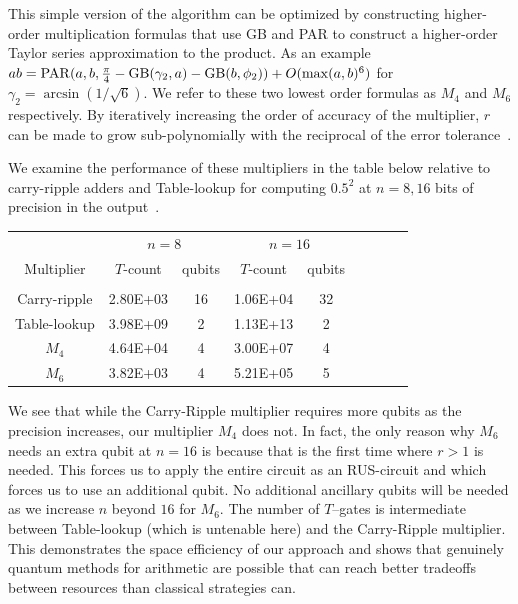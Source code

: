 \documentclass[conference]{IEEEtran}
\begin{document}
This simple version of the algorithm can be optimized by constructing higher-order multiplication formulas that use GB and PAR to construct a higher-order Taylor series approximation to the product.  As an example ${ab=\rm PAR}(a,b,\frac{\pi}{4}- {\rm GB}(\gamma_2,a)-{\rm GB}(b,\phi_2))+ O(\max(a,b)^6)$ for $\gamma_2 =\arcsin(1/\sqrt{6})$.  We refer to these two lowest order formulas as $M_4$ and $M_6$ respectively.  By iteratively increasing the order of accuracy of the multiplier, $r$ can be made to grow sub-polynomially with the reciprocal of the error tolerance~\cite{WR16}.

We examine the performance of these multipliers in the table below relative to carry-ripple adders and Table-lookup for computing $0.5^2$ at $n=8,16$ bits of precision in the output~\cite{WR16}.
\begin{table}[hbt]
\centering
\footnotesize
\begin{tabular}{c@{\qquad}c@{\quad}c@{\qquad}c@{\quad}c@{\qquad}c@{\quad}c@{\qquad}c@{\quad}c}
\hline
 & \multicolumn{2}{c}{$n=8$\phantom{111}} & \multicolumn{2}{c}{$n=16$} \\[0.2ex]
 {Multiplier}    & $T$-count & qubits & $T$-count & qubits \\
\hline\\
Carry-ripple & 2.80E+03 & 16 & 1.06E+04  &32\\[1.5ex]
Table-lookup  & 3.98E+09 & 2 & 1.13E+13& 2\\[1.5ex]
$M_4$  &4.64E+04 &4 &3.00E+07 &4 \\[1.5ex] 
$M_6$  &3.82E+03 &4 & 5.21E+05&5 \\ 
\hline
\end{tabular}
\end{table}

We see that while the Carry-Ripple multiplier requires more qubits as the precision increases, our multiplier $M_4$ does not.  In fact, the only reason why $M_6$ needs an extra qubit at $n=16$ is because that is the first time where $r>1$ is needed.  This forces us to apply the entire circuit as an RUS-circuit and which forces us to use an additional qubit.  No additional ancillary qubits will be needed as we increase $n$ beyond $16$ for $M_6$.  The number of $T$--gates is intermediate between Table-lookup (which is untenable here) and the Carry-Ripple multiplier.  This demonstrates the space efficiency of our approach and shows that genuinely quantum methods for arithmetic are possible that can reach better tradeoffs between resources than classical strategies can.
\end{document}
